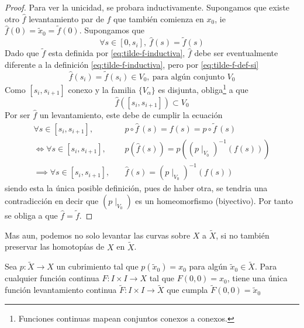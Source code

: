\begin{proof}
  Para ver la unicidad, se probara inductivamente. Supongamos que existe
  otro \(\hat{f}\) levantamiento par de \(f\) que también
  comienza en \(x_0\), ie \(\hat{f} (0) = \tilde x _0 = \tilde f
  (0)\). Supongamos que
  \begin{equation}
    \label{eq:tilde-f-def-si}
    \forall s \in [0, s_i],\ \hat{f} (s) = \tilde f (s)
  \end{equation}
  Dado que \(\tilde f\) esta definida por
  \eqref{eq:tilde-f-inductiva}, \(\hat f\) debe ser
  eventualmente diferente a la definición \eqref{eq:tilde-f-inductiva},
  pero por \eqref{eq:tilde-f-def-si}
  \[\hat f (s_i) = \tilde f (s_i) \in V_0,\ \text{para algún conjunto } V_0 \]
  Como \([s_i, s_{i+1}]\) conexo y la familia \(\{V_\alpha\}\)
  es disjunta, obliga\footnote{Funciones continuas mapean conjuntos
    conexos a conexos.} a que
  \[ \hat f \left( [s_i, s_{i+1}] \right) \subset V_0 \]
  Por ser \(\hat f\) un levantamiento, este debe de cumplir la ecuación
  \begin{align*}
    \forall s \in [s_i, s_{i+1}],\quad
        &p \circ \hat f \, (s) = f(s) = p \circ \tilde f \, (s) \\
    \iff \forall s \in [s_i, s_{i+1}],\quad
        &p \left( \hat f (s) \right) =
        p \left( \left( p \mid_{V_0} \right) ^{-1} \left( f (s) \right) \right) \\
    \implies \forall s \in [s_i, s_{i+1}],\quad
        &\hat f (s) = (p \mid_{V_0})^{-1} (f (s))
  \end{align*}
  siendo esta la única posible definición, pues de haber otra,
  se tendria una contradicción en decir que \((p \mid_{V_0})\) es un
  homeomorfismo (biyectivo). Por tanto se obliga a que \( \hat f =
  \tilde f\).
\end{proof}
Mas aun, podemos no solo levantar las curvas sobre \(X\) a \(\tilde X\),
si no también preservar las homotopías de \(X\) en \(\tilde X\).
\begin{corolario} \label{thm:levantamiento-homotopico}
  Sea \(p : \tilde X \to X\) un cubrimiento tal que \(p(\tilde x _0)
  = x_0 \) para algún \(\tilde x _0 \in \tilde X\). Para cualquier
  función continua \(F : I \times I \to X\) tal que \(F(0,0) = x_0\), tiene una
  única función levantamiento continua \(\tilde F : I \times I \to
  \tilde X\) que cumpla \(\tilde F (0,0) = \tilde x_0\)
\end{corolario}
